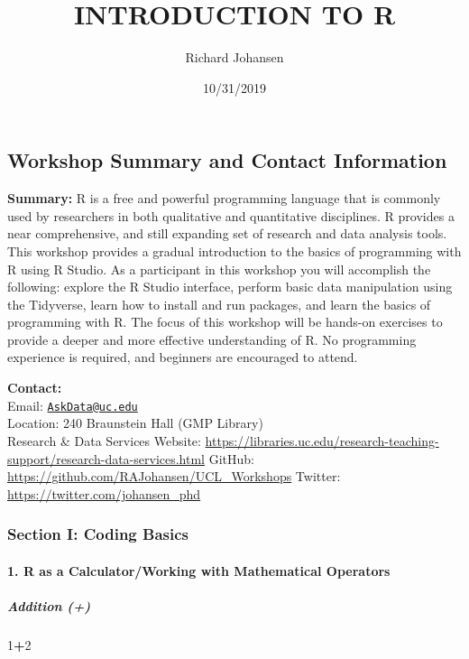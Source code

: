 \documentclass[]{article}
\title{INTRODUCTION TO R}
\author{Richard Johansen}
\date{10/31/2019}
\newenvironment{Shaded}{\begin{snugshade}}{\end{snugshade}}
\newcommand{\DecValTok}[1]{\textcolor[rgb]{0.00,0.00,0.81}{#1}}
\newcommand{\OperatorTok}[1]{\textcolor[rgb]{0.81,0.36,0.00}{\textbf{#1}}}
\let\oldparagraph\paragraph
\renewcommand{\paragraph}[1]{\oldparagraph{#1}\mbox{}}
\let\oldsubparagraph\subparagraph
\renewcommand{\subparagraph}[1]{\oldsubparagraph{#1}\mbox{}}
\begin{document}
\maketitle

\subsection{Workshop Summary and Contact
Information}\label{workshop-summary-and-contact-information}

\textbf{Summary:} R is a free and powerful programming language that is
commonly used by researchers in both qualitative and quantitative
disciplines. R provides a near comprehensive, and still expanding set of
research and data analysis tools. This workshop provides a gradual
introduction to the basics of programming with R using R Studio. As a
participant in this workshop you will accomplish the following: explore
the R Studio interface, perform basic data manipulation using the
Tidyverse, learn how to install and run packages, and learn the basics
of programming with R. The focus of this workshop will be hands-on
exercises to provide a deeper and more effective understanding of R. No
programming experience is required, and beginners are encouraged to
attend.

\textbf{Contact:}\\
Email: \href{mailto:AskData@uc.edu}{\nolinkurl{AskData@uc.edu}}\\
Location: 240 Braunstein Hall (GMP Library)\\
Research \& Data Services Website:
\url{https://libraries.uc.edu/research-teaching-support/research-data-services.html}
GitHub: \url{https://github.com/RAJohansen/UCL_Workshops} Twitter:
\url{https://twitter.com/johansen_phd}

\subsubsection{Section I: Coding Basics}\label{section-i-coding-basics}

\paragraph{1. R as a Calculator/Working with Mathematical
Operators}\label{r-as-a-calculatorworking-with-mathematical-operators}

\subparagraph{Addition (+)}\label{addition}

\begin{Shaded}
\begin{Highlighting}[]
\DecValTok{1}\OperatorTok{+}\DecValTok{2} 
\end{Highlighting}
\end{Shaded}
\end{document}
